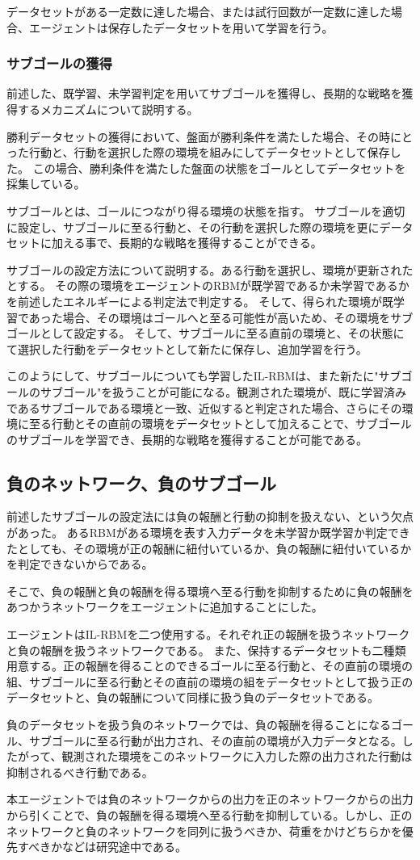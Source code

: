 データセットがある一定数に達した場合、または試行回数が一定数に達した場合、エージェントは保存したデータセットを用いて学習を行う。

\subsubsection{サブゴールの獲得}
前述した、既学習、未学習判定を用いてサブゴールを獲得し、長期的な戦略を獲得するメカニズムについて説明する。

勝利データセットの獲得において、盤面が勝利条件を満たした場合、その時にとった行動と、行動を選択した際の環境を組みにしてデータセットとして保存した。
この場合、勝利条件を満たした盤面の状態をゴールとしてデータセットを採集している。

サブゴールとは、ゴールにつながり得る環境の状態を指す。
サブゴールを適切に設定し、サブゴールに至る行動と、その行動を選択した際の環境を更にデータセットに加える事で、長期的な戦略を獲得することができる。

サブゴールの設定方法について説明する。ある行動を選択し、環境が更新されたとする。
その際の環境をエージェントのRBMが既学習であるか未学習であるかを前述したエネルギーによる判定法で判定する。
そして、得られた環境が既学習であった場合、その環境はゴールへと至る可能性が高いため、その環境をサブゴールとして設定する。
そして、サブゴールに至る直前の環境と、その状態にて選択した行動をデータセットとして新たに保存し、追加学習を行う。

このようにして、サブゴールについても学習したIL-RBMは、また新たに"サブゴールのサブゴール"を扱うことが可能になる。観測された環境が、既に学習済みであるサブゴールである環境と一致、近似すると判定された場合、さらにその環境に至る行動とその直前の環境をデータセットとして加えることで、サブゴールのサブゴールを学習でき、長期的な戦略を獲得することが可能である。

\subsection{負のネットワーク、負のサブゴール}
前述したサブゴールの設定法には負の報酬と行動の抑制を扱えない、という欠点があった。
あるRBMがある環境を表す入力データを未学習か既学習か判定できたとしても、その環境が正の報酬に紐付いているか、負の報酬に紐付いているかを判定できないからである。

そこで、負の報酬と負の報酬を得る環境へ至る行動を抑制するために負の報酬をあつかうネットワークをエージェントに追加することにした。

エージェントはIL-RBMを二つ使用する。それぞれ正の報酬を扱うネットワークと負の報酬を扱うネットワークである。
また、保持するデータセットも二種類用意する。正の報酬を得ることのできるゴールに至る行動と、その直前の環境の組、サブゴールに至る行動とその直前の環境の組をデータセットとして扱う正のデータセットと、負の報酬について同様に扱う負のデータセットである。

負のデータセットを扱う負のネットワークでは、負の報酬を得ることになるゴール、サブゴールに至る行動が出力され、その直前の環境が入力データとなる。したがって、観測された環境をこのネットワークに入力した際の出力された行動は抑制されるべき行動である。

本エージェントでは負のネットワークからの出力を正のネットワークからの出力から引くことで、負の報酬を得る環境へ至る行動を抑制している。しかし、正のネットワークと負のネットワークを同列に扱うべきか、荷重をかけどちらかを優先すべきかなどは研究途中である。


